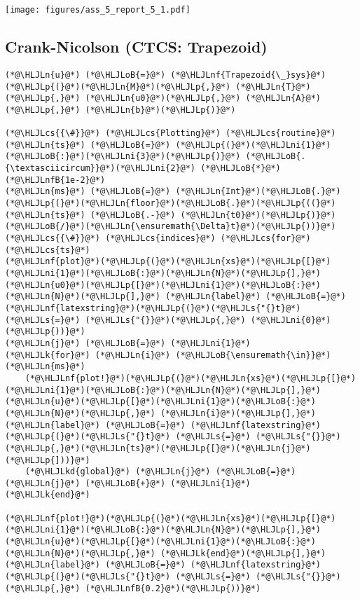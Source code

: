 \documentclass[12pt,a4paper]{article}
\newcommand{\HLJLk}[1]{\textcolor[RGB]{148,91,176}{\textbf{#1}}}
\newcommand{\HLJLkd}[1]{\textcolor[RGB]{214,102,97}{\textit{#1}}}
\newcommand{\HLJLn}[1]{#1}
\newcommand{\HLJLnf}[1]{\textcolor[RGB]{66,102,213}{#1}}
\newcommand{\HLJLs}[1]{\textcolor[RGB]{201,61,57}{#1}}
\newcommand{\HLJLnfB}[1]{\textcolor[RGB]{59,151,46}{#1}}
\newcommand{\HLJLni}[1]{\textcolor[RGB]{59,151,46}{#1}}
\newcommand{\HLJLoB}[1]{\textcolor[RGB]{102,102,102}{\textbf{#1}}}
\newcommand{\HLJLp}[1]{#1}
\newcommand{\HLJLcs}[1]{\textcolor[RGB]{153,153,119}{\textit{#1}}}
\begin{document}
\texttt{[image: figures/ass\_5\_report\_5\_1.pdf]}

\subsection{Crank-Nicolson (CTCS: Trapezoid)}

\begin{lstlisting}
(*@\HLJLn{u}@*) (*@\HLJLoB{=}@*) (*@\HLJLnf{Trapezoid{\_}sys}@*)(*@\HLJLp{(}@*)(*@\HLJLn{M}@*)(*@\HLJLp{,}@*) (*@\HLJLn{T}@*)(*@\HLJLp{,}@*) (*@\HLJLn{u0}@*)(*@\HLJLp{,}@*) (*@\HLJLn{A}@*)(*@\HLJLp{,}@*) (*@\HLJLn{b}@*)(*@\HLJLp{)}@*)

(*@\HLJLcs{{\#}}@*) (*@\HLJLcs{Plotting}@*) (*@\HLJLcs{routine}@*)
(*@\HLJLn{ts}@*) (*@\HLJLoB{=}@*) (*@\HLJLp{(}@*)(*@\HLJLni{1}@*)(*@\HLJLoB{:}@*)(*@\HLJLni{3}@*)(*@\HLJLp{)}@*) (*@\HLJLoB{.{\textasciicircum}}@*)(*@\HLJLni{2}@*) (*@\HLJLoB{*}@*) (*@\HLJLnfB{1e-2}@*)
(*@\HLJLn{ms}@*) (*@\HLJLoB{=}@*) (*@\HLJLn{Int}@*)(*@\HLJLoB{.}@*)(*@\HLJLp{(}@*)(*@\HLJLn{floor}@*)(*@\HLJLoB{.}@*)(*@\HLJLp{((}@*)(*@\HLJLn{ts}@*) (*@\HLJLoB{.-}@*) (*@\HLJLn{t0}@*)(*@\HLJLp{)}@*)(*@\HLJLoB{/}@*)(*@\HLJLn{\ensuremath{\Delta}t}@*)(*@\HLJLp{))}@*)(*@\HLJLcs{{\#}}@*) (*@\HLJLcs{indices}@*) (*@\HLJLcs{for}@*) (*@\HLJLcs{ts}@*)
(*@\HLJLnf{plot}@*)(*@\HLJLp{(}@*)(*@\HLJLn{xs}@*)(*@\HLJLp{[}@*)(*@\HLJLni{1}@*)(*@\HLJLoB{:}@*)(*@\HLJLn{N}@*)(*@\HLJLp{],}@*) (*@\HLJLn{u0}@*)(*@\HLJLp{[}@*)(*@\HLJLni{1}@*)(*@\HLJLoB{:}@*)(*@\HLJLn{N}@*)(*@\HLJLp{],}@*) (*@\HLJLn{label}@*) (*@\HLJLoB{=}@*) (*@\HLJLnf{latexstring}@*)(*@\HLJLp{(}@*)(*@\HLJLs{"{}t}@*) (*@\HLJLs{=}@*) (*@\HLJLs{"{}}@*)(*@\HLJLp{,}@*) (*@\HLJLni{0}@*) (*@\HLJLp{))}@*)
(*@\HLJLn{j}@*) (*@\HLJLoB{=}@*) (*@\HLJLni{1}@*)
(*@\HLJLk{for}@*) (*@\HLJLn{i}@*) (*@\HLJLoB{\ensuremath{\in}}@*) (*@\HLJLn{ms}@*)
    (*@\HLJLnf{plot!}@*)(*@\HLJLp{(}@*)(*@\HLJLn{xs}@*)(*@\HLJLp{[}@*)(*@\HLJLni{1}@*)(*@\HLJLoB{:}@*)(*@\HLJLn{N}@*)(*@\HLJLp{],}@*) (*@\HLJLn{u}@*)(*@\HLJLp{[}@*)(*@\HLJLni{1}@*)(*@\HLJLoB{:}@*)(*@\HLJLn{N}@*)(*@\HLJLp{,}@*) (*@\HLJLn{i}@*)(*@\HLJLp{],}@*) (*@\HLJLn{label}@*) (*@\HLJLoB{=}@*) (*@\HLJLnf{latexstring}@*)(*@\HLJLp{(}@*)(*@\HLJLs{"{}t}@*) (*@\HLJLs{=}@*) (*@\HLJLs{"{}}@*)(*@\HLJLp{,}@*)(*@\HLJLn{ts}@*)(*@\HLJLp{[}@*)(*@\HLJLn{j}@*)(*@\HLJLp{]))}@*)
    (*@\HLJLkd{global}@*) (*@\HLJLn{j}@*) (*@\HLJLoB{=}@*) (*@\HLJLn{j}@*) (*@\HLJLoB{+}@*) (*@\HLJLni{1}@*)
(*@\HLJLk{end}@*)

(*@\HLJLnf{plot!}@*)(*@\HLJLp{(}@*)(*@\HLJLn{xs}@*)(*@\HLJLp{[}@*)(*@\HLJLni{1}@*)(*@\HLJLoB{:}@*)(*@\HLJLn{N}@*)(*@\HLJLp{],}@*) (*@\HLJLn{u}@*)(*@\HLJLp{[}@*)(*@\HLJLni{1}@*)(*@\HLJLoB{:}@*)(*@\HLJLn{N}@*)(*@\HLJLp{,}@*) (*@\HLJLk{end}@*)(*@\HLJLp{],}@*) (*@\HLJLn{label}@*) (*@\HLJLoB{=}@*) (*@\HLJLnf{latexstring}@*)(*@\HLJLp{(}@*)(*@\HLJLs{"{}t}@*) (*@\HLJLs{=}@*) (*@\HLJLs{"{}}@*)(*@\HLJLp{,}@*) (*@\HLJLnfB{0.2}@*)(*@\HLJLp{))}@*)
\end{lstlisting}
\end{document}
